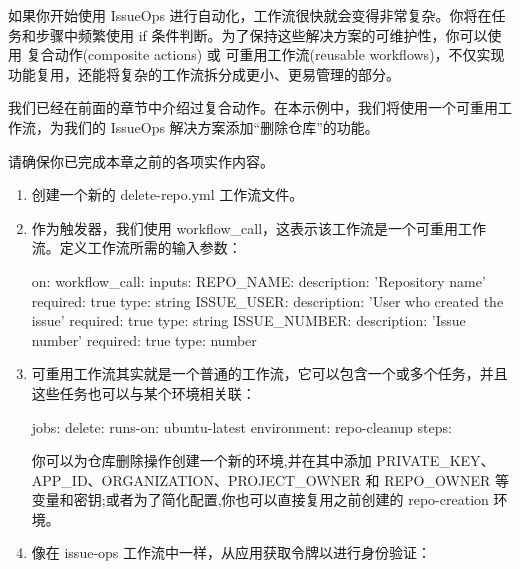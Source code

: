 如果你开始使用 IssueOps 进行自动化，工作流很快就会变得非常复杂。你将在任务和步骤中频繁使用 if 条件判断。为了保持这些解决方案的可维护性，你可以使用 复合动作(composite actions) 或 可重用工作流(reusable workflows)，不仅实现功能复用，还能将复杂的工作流拆分成更小、更易管理的部分。

我们已经在前面的章节中介绍过复合动作。在本示例中，我们将使用一个可重用工作流，为我们的 IssueOps 解决方案添加“删除仓库”的功能。


请确保你已完成本章之前的各项实作内容。


\begin{enumerate}
\item 
创建一个新的 delete-repo.yml 工作流文件。

\item 
作为触发器，我们使用 workflow\_call，这表示该工作流是一个可重用工作流。定义工作流所需的输入参数：

\begin{shell}
on:
  workflow_call:
    inputs:
      REPO_NAME:
        description: 'Repository name'
        required: true
        type: string
      ISSUE_USER:
        description: 'User who created the issue'
        required: true
        type: string
      ISSUE_NUMBER:
        description: 'Issue number'
        required: true
        type: number
\end{shell}

\item 
可重用工作流其实就是一个普通的工作流，它可以包含一个或多个任务，并且这些任务也可以与某个环境相关联：

\begin{shell}
  jobs:
    delete:
      runs-on: ubuntu-latest
      environment: repo-cleanup
      steps:
\end{shell}

你可以为仓库删除操作创建一个新的环境,并在其中添加 PRIVATE\_KEY、APP\_ID、ORGANIZATION、PROJECT\_OWNER 和 REPO\_OWNER 等变量和密钥;或者为了简化配置,你也可以直接复用之前创建的 repo-creation 环境。

\item 
像在 issue-ops 工作流中一样，从应用获取令牌以进行身份验证：



\end{enumerate}
